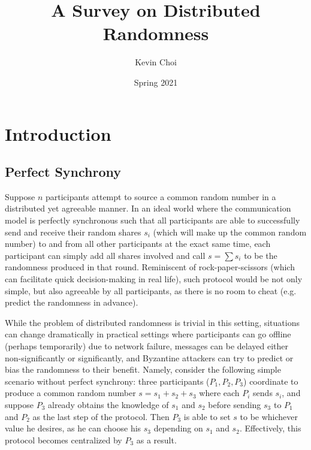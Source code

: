 \documentclass[11pt]{article}
\title{A Survey on Distributed Randomness}
\author{Kevin Choi}
\date{Spring 2021}
\theoremstyle{definition}
\theoremstyle{remark}
\begin{document}
\maketitle
\tableofcontents
\pagebreak

\section{Introduction}
\subsection{Perfect Synchrony}
Suppose $n$ participants attempt to source a common random number in a distributed yet agreeable manner. In an ideal world where the communication model is perfectly synchronous such that all participants are able to successfully send and receive their random shares $s_i$ (which will make up the common random number) to and from all other participants at the exact same time, each participant can simply add all shares involved and call $s = \sum s_i$ to be the randomness produced in that round. Reminiscent of rock-paper-scissors (which can facilitate quick decision-making in real life), such protocol would be not only simple, but also agreeable by all participants, as there is no room to cheat (e.g. predict the randomness in advance).

While the problem of distributed randomness is trivial in this setting, situations can change dramatically in practical settings where participants can go offline (perhaps temporarily) due to network failure, messages can be delayed either non-significantly or significantly, and Byzantine attackers can try to predict or bias the randomness to their benefit. Namely, consider the following simple scenario without perfect synchrony: three participants ($P_1, P_2, P_3$) coordinate to produce a common random number $s = s_1 + s_2 + s_3$ where each $P_i$ sends $s_i$, and suppose $P_3$ already obtains the knowledge of $s_1$ and $s_2$ before sending $s_3$ to $P_1$ and $P_2$ as the last step of the protocol. Then $P_3$ is able to set $s$ to be whichever value he desires, as he can choose his $s_3$ depending on $s_1$ and $s_2$. Effectively, this protocol becomes centralized by $P_3$ as a result.
\end{document}
